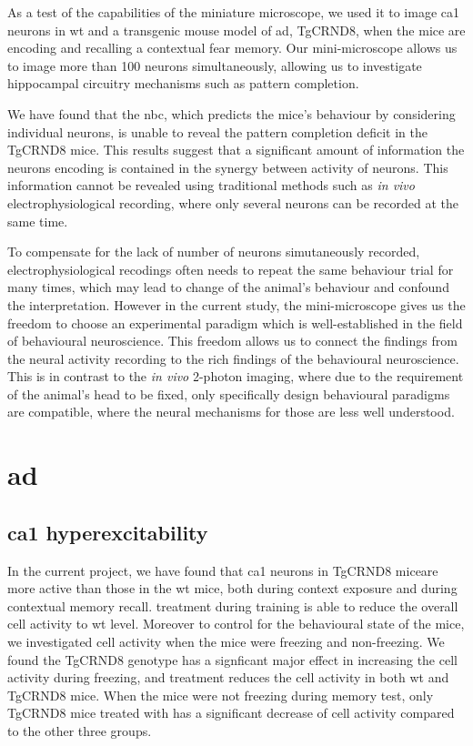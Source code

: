 As a test of the capabilities of the miniature microscope, we used it to image \gls{ca1} neurons in \gls{wt} and a transgenic mouse model of \gls{ad}, TgCRND8, when the mice are encoding and recalling a contextual fear memory. Our mini-microscope allows us to image more than \num{100} neurons simultaneously, allowing us to investigate hippocampal circuitry mechanisms such as pattern completion. 

We have found that the \gls{nbc}, which predicts the mice's behaviour by considering individual neurons, is unable to reveal the pattern completion deficit in the TgCRND8 mice. This results suggest that a significant amount of information the neurons encoding is contained in the synergy between activity of neurons. This information cannot be revealed using traditional methods such as \textit{in vivo} electrophysiological recording, where only several neurons can be recorded at the same time. 

To compensate for the lack of number of neurons simutaneously recorded, electrophysiological recodings often needs to repeat the same behaviour trial for many times, which may lead to change of the animal's behaviour and confound the interpretation. However in the current study, the mini-microscope gives us the freedom to choose an experimental paradigm which is well-established in the field of behavioural neuroscience. This freedom allows us to connect the findings from the neural activity recording to the rich findings of the behavioural neuroscience. This is in contrast to the \textit{in vivo} 2-photon imaging, where due to the requirement of the animal's head to be fixed, only specifically design behavioural paradigms are compatible, where the neural mechanisms for those are less well understood. 



\section{\gls{ad}}

\subsection{\gls{ca1} hyperexcitability}
In the current project, we have found that \gls{ca1} neurons in TgCRND8 miceare more active than those in the \gls{wt} mice, both during context exposure and during contextual memory recall. \tglu{} treatment during training is able to reduce the overall cell activity to \gls{wt} level. Moreover to control for the behavioural state of the mice, we investigated cell activity when the mice were freezing and non-freezing. We found the TgCRND8 genotype has a signficant major effect in increasing the cell activity during freezing, and \tglu treatment reduces the cell activity in both \gls{wt} and TgCRND8 mice. When the mice were not freezing during memory test, only TgCRND8 mice treated with \tglu has a significant decrease of cell activity compared to the other three groups. 

